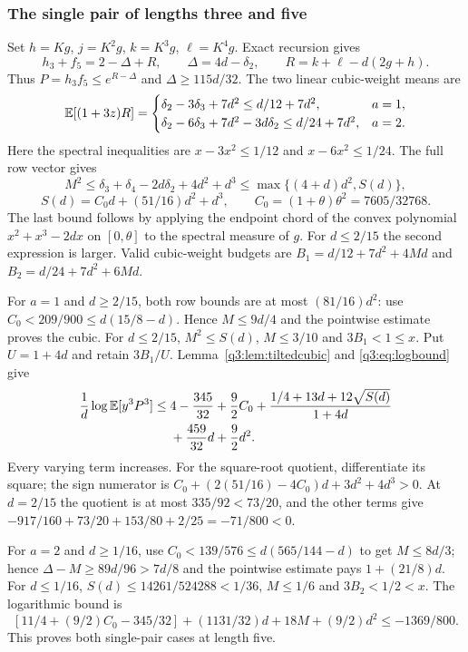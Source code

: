 \subsubsection{The single pair of lengths three and five}
Set $h=Kg$, $j=K^2g$, $k=K^3g$, $\ell=K^4g$. Exact recursion gives
\[
 h_3+f_5=2-\Delta+R,\qquad
 \Delta=4d-\delta_{2},\qquad R=k+\ell-d(2g+h).
\]
Thus $P=h_3f_5\le e^{R-\Delta}$ and $\Delta\ge115d/32$.
The two linear cubic-weight means are
\[
 \mathbb E[(1+3z)R]=
 \begin{cases}
 \delta_{2}-3\delta_{3}+7d^2\le d/12+7d^2,&a=1,\\
 \delta_{2}-6\delta_{3}+7d^2-3d\delta_{2}\le d/24+7d^2,&a=2.
 \end{cases}
\]
Here the spectral inequalities are $x-3x^2\le1/12$ and $x-6x^2\le1/24$.
The full row vector gives
\[
 M^2\le \delta_{3}+\delta_{4}-2d\delta_{2}+4d^2+d^3
 \le\max\{(4+d)d^2,S(d)\},
\]
\[
 S(d)=C_0d+(51/16)d^2+d^3,\qquad C_0=(1+\theta)\theta^2=7605/32768.
\]
The last bound follows by applying the endpoint chord of the convex polynomial $x^2+x^3-2dx$ on $[0,\theta]$ to the spectral measure of $g$. For $d\le2/15$ the second expression is larger. Valid cubic-weight budgets are
$B_1=d/12+7d^2+4Md$ and $B_2=d/24+7d^2+6Md$.

For $a=1$ and $d\ge2/15$, both row bounds are at most $(81/16)d^2$: use $C_0<209/900\le d(15/8-d)$. Hence $M\le9d/4$ and the pointwise estimate proves the cubic. For $d\le2/15$, $M^2\le S(d)$, $M\le3/10$ and $3B_1<1\le x$. Put $U=1+4d$ and retain $3B_1/U$. Lemma~\ref{q3:lem:tiltedcubic} and \eqref{q3:eq:logbound} give
\[
\begin{split}
 \frac1d\log\mathbb E[y^3P^3]\le{}&
 4-\frac{345}{32}+\frac92C_0+
 \frac{1/4+13d+12\sqrt{S(d)}}{1+4d}\\
 &+\frac{459}{32}d+\frac92d^2.
\end{split}
\]
Every varying term increases. For the square-root quotient, differentiate its square; the sign numerator is
$C_0+(2(51/16)-4C_0)d+3d^2+4d^3>0$.
At $d=2/15$ the quotient is at most $335/92<73/20$, and the other terms give
$-917/160+73/20+153/80+2/25=-71/800<0$.

For $a=2$ and $d\ge1/16$, use $C_0<139/576\le d(565/144-d)$ to get $M\le8d/3$; hence $\Delta-M\ge89d/96>7d/8$ and the pointwise estimate pays $1+(21/8)d$.
For $d\le1/16$, $S(d)\le14261/524288<1/36$, $M\le1/6$ and $3B_2<1/2<x$. The logarithmic bound is
\[
 [11/4+(9/2)C_0-345/32]+(1131/32)d+18M+(9/2)d^2
 \le-1369/800.
\]
This proves both single-pair cases at length five.

